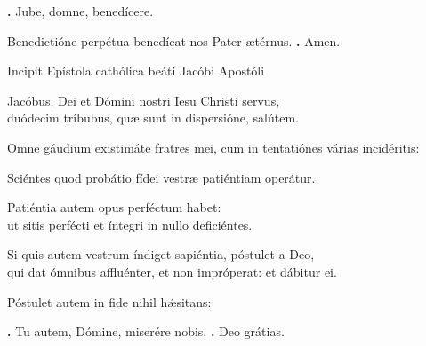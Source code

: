 \begin{small}
\textbf{\Vbar.} Jube, domne, benedícere.

Benedictióne perpétua benedícat nos Pater ætérnus. \textbf{\Rbar.} Amen.
\end{small}


Incipit Epístola cathólica beáti Jacóbi Apostóli

Jacóbus, Dei et Dómini nostri Iesu Christi servus, \\
duódecim tríbubus, quæ sunt in dispersióne, salútem.

Omne gáudium existimáte fratres mei, cum in tentatiónes várias incidéritis:

Sciéntes quod probátio fídei vestræ patiéntiam operátur.

Patiéntia autem opus perféctum habet: \\
ut sitis perfécti et íntegri in nullo deficiéntes.

Si quis autem vestrum índiget sapiéntia, póstulet a Deo, \\
qui dat ómnibus affluénter, et non impróperat: et dábitur ei.

Póstulet autem in fide nihil hǽsitans:

\textbf{\Vbar.} Tu autem, Dómine, miserére nobis.
\textbf{\Rbar.} Deo grátias.


